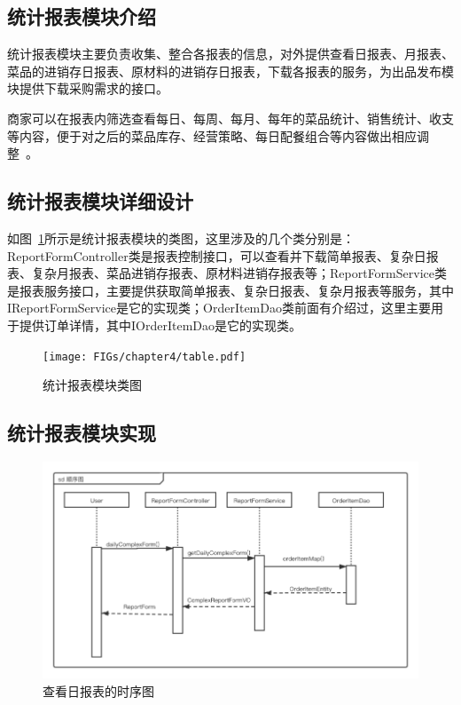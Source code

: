 \subsection{统计报表模块介绍}
统计报表模块主要负责收集、整合各报表的信息，对外提供查看日报表、月报表、菜品的进销存日报表、原材料的进销存日报表，下载各报表的服务，为出品发布模块提供下载采购需求的接口。

商家可以在报表内筛选查看每日、每周、每月、每年的菜品统计、销售统计、收支等内容，便于对之后的菜品库存、经营策略、每日配餐组合等内容做出相应调整~\cite{dwh2019}。\\

\subsection{统计报表模块详细设计}
如图~\ref{fig_table}所示是统计报表模块的类图，这里涉及的几个类分别是：ReportFormController类是报表控制接口，可以查看并下载简单报表、复杂日报表、复杂月报表、菜品进销存报表、原材料进销存报表等；ReportFormService类是报表服务接口，主要提供获取简单报表、复杂日报表、复杂月报表等服务，其中IReportFormService是它的实现类；OrderItemDao类前面有介绍过，这里主要用于提供订单详情，其中IOrderItemDao是它的实现类。

\begin{figure}[htbp!]
    \centering
    \texttt{[image: FIGs/chapter4/table.pdf]}
    \caption{统计报表模块类图}\label{fig_table}
\end{figure}

\subsection{统计报表模块实现}
\begin{figure}[htbp!]
    \centering
    \includegraphics[width=5in]{FIGs/chapter4/table_time.pdf}
    \caption{查看日报表的时序图}\label{fig_table_time}
\end{figure}

